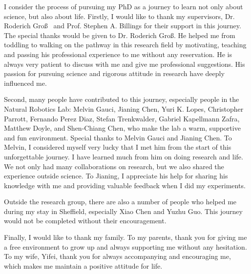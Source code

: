I consider the process of pursuing my PhD as a journey to learn not only about science, but also about life. Firstly, I would like to thank my supervisors, Dr. Roderich Gro\ss 
~and Prof. Stephen A. Billings for their support in this journey. The special thanks would be given to Dr. Roderich Gro\ss. He helped me from toddling to walking on the pathway in this research field by motivating, teaching and passing his professional experience to me without any reservation. He is always very patient to discuss with me and give me professional suggestions. His passion for pursuing science and rigorous attitude in research have deeply influenced me. 

Second, many people have contributed to this journey, especially people in the Natural Robotics Lab: Melvin Gauci, Jianing Chen, Yuri K. Lopes, Christopher Parrott, Fernando Perez Diaz, Stefan Trenkwalder, Gabriel Kapellmann Zafra, Matthew Doyle, and Shen-Chiang Chen, who make the lab a warm, supportive and fun environment. Special thanks to Melvin Gauci and Jianing Chen. To Melvin, I considered myself very lucky that I met him from the start of this unforgettable journey. I have learned much from him on doing research and life. We not only had many collaborations on research, but we also shared the experience outside science. To Jianing, I appreciate his help for sharing his knowledge with me and providing valuable feedback when I did my experiments. 

Outside the research group, there are also a number of people who helped me during my stay in Sheffield, especially Xiao Chen and Yuzhu Guo. This journey would not be completed without their encouragement. 
   
Finally, I would like to thank my family. To my parents, thank you for giving me a free environment to grow up and always supporting me without any hesitation. To my wife, Yifei, thank you for always accompanying and encouraging me, which makes me maintain a positive attitude for life. 


